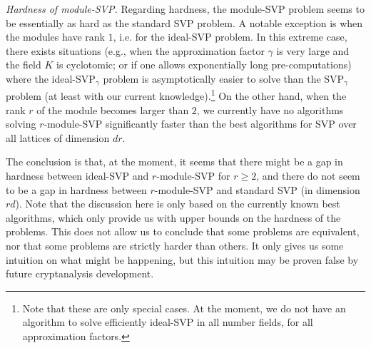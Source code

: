 \noindent\textit{Hardness of module-SVP.} Regarding hardness, the module-SVP problem seems to be essentially as hard as the standard SVP problem. A notable exception is when the modules have rank $1$, i.e. for the ideal-SVP problem. In this extreme case, there exists situations (e.g., when the approximation factor $\gamma$ is very large and the field $K$ is cyclotomic; or if one allows exponentially long pre-computations) where the ideal-SVP$_\gamma$ problem is asymptotically easier to solve than the SVP$_\gamma$ problem (at least with our current knowledge).\footnote{Note that these are only special cases. At the moment, we do not have an algorithm to solve efficiently ideal-SVP in all number fields, for all approximation factors.}
On the other hand, when the rank $r$ of the module becomes larger than $2$, we currently have no algorithms solving $r$-module-SVP significantly faster than the best algorithms for SVP over all lattices of dimension $dr$.

The conclusion is that, at the moment, it seems that there might be a gap in hardness between ideal-SVP and $r$-module-SVP for $r \geq 2$, and there do not seem to be a gap in hardness between $r$-module-SVP and standard SVP (in dimension $rd$). Note that the discussion here is only based on the currently known best algorithms, which only provide us with upper bounds on the hardness of the problems. This does not allow us to conclude that some problems are equivalent, nor that some problems are strictly harder than others. It only gives us some intuition on what might be happening, but this intuition may be proven false by future cryptanalysis development.







